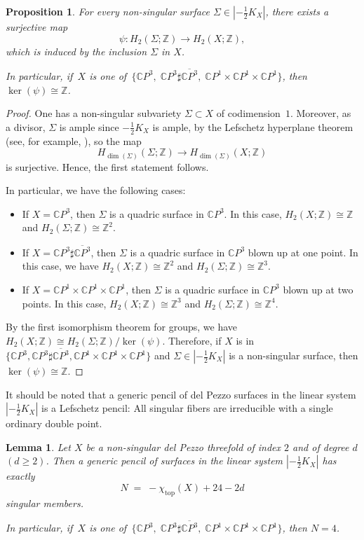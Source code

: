 \documentclass[10pt,a4paper]{article}
\numberwithin{equation}{section}
\theoremstyle{definition}
\theoremstyle{plain}
\newtheorem{proposition}[definition]{Proposition}
\newtheorem{lemma}[definition]{Lemma}
\theoremstyle{remark}
\newcommand{\Z}{\mathbb{Z}}
\newcommand{\C}{\mathbb{C}}
\newcommand{\lra}{\longrightarrow}
\begin{document}
\begin{proposition} \label{Prop-why.degree.is.678}
  For every non-singular surface $\Sigma\in |-\frac{1}{2}K_X|$, there exists a surjective map
  $$\psi \colon  H_2(\Sigma;\mathbb{Z})\lra H_2(X;\mathbb{Z}),$$
  which is induced by the inclusion $\Sigma$ in $X$.
 
In particular, if\,  $X$ is one of\, $\{\C P^3,\; \C P^3\sharp \overline{ \C P^3},\;\C P^1\times \C P^1 \times \C P^1\}$, then $\ker(\psi)\cong \mathbb{Z}$. 
\end{proposition}

\begin{proof}
  One has a non-singular subvariety $\Sigma \subset X$ of codimension~$1$. Moreover, as a divisor, $\Sigma$ is ample since $-\frac{1}{2}K_X$ is ample, by the Lefschetz hyperplane theorem (see, for example, \cite[Theorem C.8]{eisenbud20163264}), so the map
$$ H_{\dim(\Sigma)}(\Sigma;\mathbb{Z})\lra H_{\dim(\Sigma)}(X;\mathbb{Z})$$
is surjective. Hence, the first statement follows. 

In particular, we have the following cases: 
\begin{itemize}
\item If $X=\C P^3$, then $\Sigma$ is a quadric surface in $\C P^3$. In this case, $H_2(X;\mathbb{Z})\cong \Z$ and $H_2(\Sigma;\mathbb{Z})\cong \Z^2$.
\item If $X=\C P^3\sharp \overline{ \C P^3}$, then $\Sigma$ is a quadric surface in $\C P^3$ blown up at one point. In this case, we have $H_2(X;\mathbb{Z})\cong \Z^2$ and $H_2(\Sigma;\mathbb{Z})\cong \Z^3$.
\item If $X=\C P^1\times \C P^1 \times \C P^1$, then $\Sigma$ is a quadric surface in $\C P^3$ blown up at two points. In this case, $H_2(X;\mathbb{Z})\cong \Z^3$ and $H_2(\Sigma;\mathbb{Z})\cong \Z^4$.
\end{itemize}
By the first isomorphism theorem for groups, we have $H_2(X;\mathbb{Z})\cong H_2(\Sigma;\mathbb{Z})/\ker(\psi)$. Therefore, if  $X$ is in $\{\C P^3, \C P^3\sharp \overline{ \C P^3} ,\C P^1\times \C P^1 \times \C P^1\}$ and $\Sigma \in  |-\frac{1}{2}K_X|$ is a non-singular surface, then  $\ker(\psi)\cong\mathbb{Z}$. 
\end{proof}

It should be noted that a generic pencil of del Pezzo surfaces in the linear system $|-\frac{1}{2}K_X|$ is a 
 Lefschetz pencil: All singular fibers are irreducible with a single ordinary double point. 

\begin{lemma} \label{lem-4.singulars}
Let $X$ be a non-singular del Pezzo threefold of index $2$ and of degree $d$ $(d\geq 2)$.  
Then a generic pencil of surfaces in the linear system $|-\tfrac{1}{2}K_X|$ has exactly
\[
N \;=\;- \chi_{\mathrm{top}}(X)+24-2d
\]
singular members.  

In particular, if\,  $X$ is one of\, $\{\C P^3,\; \C P^3\sharp \overline{ \C P^3},\;\C P^1\times \C P^1 \times \C P^1\}$, then $N=4$.
\end{lemma}
\end{document}
